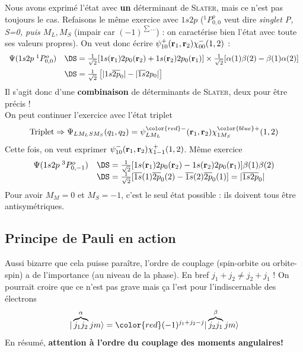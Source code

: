 Nous avons exprimé l'état avec \textbf{un} déterminant de \textsc{Slater}, mais ce n'est pas toujours
le cas. Refaisons le même exercice avec $1s2p$ ($^1P^o_{0,0}$ veut dire \textit{singlet P, S=0, 
puis $M_L,M_S$} (impair car $(-1)^{\sum\dots}$) : on caractérise bien l'état avec toute ses valeurs
propres). On veut donc écrire $\psi^{+}_{10}( {\bf r}_1, {\bf r}_2)  \chi^{-}_{00}(1,2)$ :
\begin{equation}
\begin{array}{ll}
\Psi(1s2p \; ^1P^o_{0,0})&\DS = 
 \frac{1}{\sqrt{2}} [1s( {\bf r}_1) 2p_0 ({\bf r}_2) +
1s( {\bf r}_2) 2p_0 ({\bf r}_1) ]\times
 \frac{1}{\sqrt{2}}  [\alpha(1) \beta(2) 
- \beta(1) \alpha(2) ]\vspace{2mm}\\
&\DS = \frac{1}{\sqrt{2}}  
\left[
\vert 1s \overline{2p}_0 \vert
-
\vert \overline{1s} 2p_0 \vert
\right]
\end{array}
\end{equation}
Il s'agit donc d'une \textbf{combinaison} de déterminants de \textsc{Slater}, deux pour être précis 
!\\

On peut continuer l'exercice avec l'état triplet
\begin{equation}
\mbox{Triplet} \Rightarrow 
\Psi_{LM_LSM_S}(q_1,q_2) = 
\psi^{\color{red} -}_{LM_L}( {\bf r}_1, {\bf r}_2) 
\chi^{\color{blue} +}_{1M_S}(1,2)
\end{equation}
Cette fois, on veut exprimer $\psi^{-}_{10}( {\bf r}_1, {\bf r}_2)  \chi^{+}_{1-1}(1,2)$. Même 
exercice
\begin{equation}
\begin{array}{ll}
\Psi(1s2p \; ^3P^o_{0,-1}) &\DS= 
 \frac{1}{\sqrt{2}} [1s( {\bf r}_1) 2p_0 ({\bf r}_2) - 
1s( {\bf r}_2) 2p_0 ({\bf r}_1) ] \beta(1) \beta(2)\\
&\DS = \frac{1}{\sqrt{2}} 
[ \overline{1s}(1) \overline{2p}_0(2) 
- \overline{1s}(2) \overline{2p}_0(1) ]
=\vert \overline{1s} \overline{2p}_0 \vert
\end{array}
\end{equation}
Pour avoir $M_M=0$ et $M_S=-1$, c'est le seul état possible : ils doivent tous être antisymétriques.

\subsection{Principe de Pauli en action}
Aussi bizarre que cela puisse paraître, l'ordre de couplage (spin-orbite ou orbite-spin) a de 
l'importance (au niveau de la phase). En bref $j_1+j_2 \neq j_2+j_1$ ! On pourrait croire que ce n'est
pas grave mais ça l'est pour l'indiscernable des électrons
\begin{equation}
\vert \overbrace{j_1 j_2}^{\alpha} j m \rangle = 
{\color{red} 
(-1)^{j_1 + j_2 -j}    }
\vert \overbrace{j_2 j_1}^{\beta}j m \rangle
\end{equation}
En résumé, \textbf{attention à l'ordre du couplage des moments angulaires!}\\

